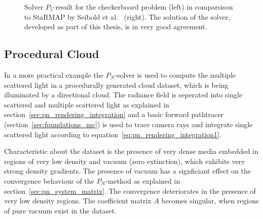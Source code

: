 \begin{figure}[h]
\begin{subfigure}{0.49\columnwidth}
\end{subfigure}%
\caption{Solver $P_5$-result for the checkerboard problem (left) in comparsison to \textsf{StaRMAP} by Seibold et al.~\cite{Seibold14} (right). The solution of the solver, developed as part of this thesis, is in very good agreement.}
\label{fig:pn_results_checkerboard1}
\end{figure}

\subsection{Procedural Cloud}
\label{sec:pn_results_clouds}

In a more practical example the $P_N$-solver is used to compute the multiple scattered light in a procedurally generated cloud dataset, which is being illuminated by a directional cloud. The radiance field is seperated into single scattered and multiple scattered light as explained in section~\ref{sec:pn_rendering_integration} and a basic forward pathtracer (section~\ref{sec:foundations_mc}) is used to trace camera rays and integrate single scattered light according to equation~\ref{eq:pn_rendering_integration1}.

Characteristic about the dataset is the presence of very dense media embedded in regions of very low density and vacuum (zero extinction), which exhibits very strong density gradients. The presence of vacuum has a signficiant effect on the convergence behaviour of the $P_N$-method as explained in section~\ref{sec:pn_system_matrix}. The convergence deteriorates in the presence of very low density regions. The coefficient matrix $A$ becomes singular, when regions of pure vacuum exist in the dataset.

